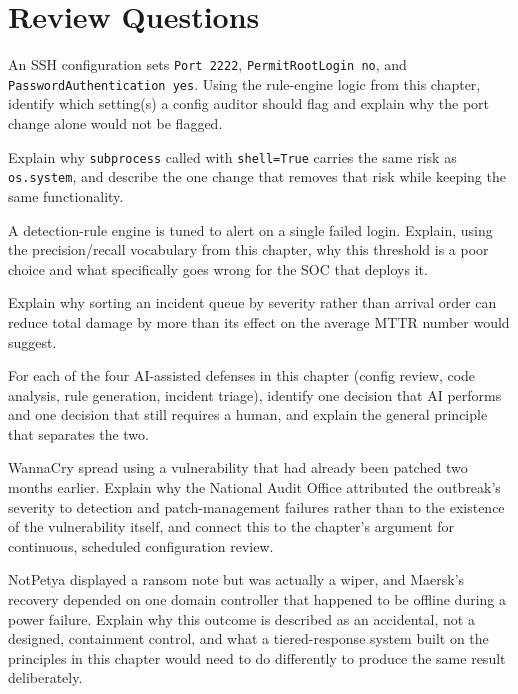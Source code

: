 \section*{Review Questions}
\begin{reviewquestions}
\item An SSH configuration sets \texttt{Port 2222}, \texttt{PermitRootLogin no}, and
\texttt{PasswordAuthentication yes}. Using the rule-engine logic from this chapter, identify which
setting(s) a config auditor should flag and explain why the port change alone would not be flagged.
\item Explain why \texttt{subprocess} called with \texttt{shell=True} carries the same risk as
\texttt{os.system}, and describe the one change that removes that risk while keeping the same
functionality.
\item A detection-rule engine is tuned to alert on a single failed login. Explain, using the
precision/recall vocabulary from this chapter, why this threshold is a poor choice and what
specifically goes wrong for the SOC that deploys it.
\item Explain why sorting an incident queue by severity rather than arrival order can reduce total
damage by more than its effect on the average MTTR number would suggest.
\item For each of the four AI-assisted defenses in this chapter (config review, code analysis,
rule generation, incident triage), identify one decision that AI performs and one decision that
still requires a human, and explain the general principle that separates the two.
\item WannaCry spread using a vulnerability that had already been patched two months earlier.
Explain why the National Audit Office attributed the outbreak's severity to detection and
patch-management failures rather than to the existence of the vulnerability itself, and connect
this to the chapter's argument for continuous, scheduled configuration review.
\item NotPetya displayed a ransom note but was actually a wiper, and Maersk's recovery depended on
one domain controller that happened to be offline during a power failure. Explain why this
outcome is described as an accidental, not a designed, containment control, and what a
tiered-response system built on the principles in this chapter would need to do differently to
produce the same result deliberately.
\end{reviewquestions}

